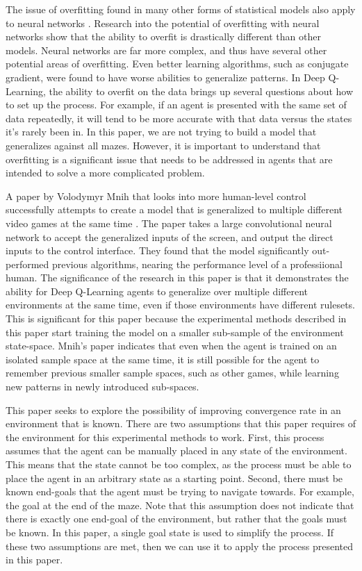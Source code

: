 \documentclass[12pt,letterpaper]{article}
\begin{document}
The issue of overfitting found in many other forms of statistical models also apply to neural networks \cite{article_overfitting_neural_networks}.
Research into the potential of overfitting with neural networks show that the ability to overfit is drastically different than other models.
Neural networks are far more complex, and thus have several other potential areas of overfitting.
Even better learning algorithms, such as conjugate gradient, were found to have worse abilities to generalize patterns.
In Deep Q-Learning, the ability to overfit on the data brings up several questions about how to set up the process.
For example, if an agent is presented with the same set of data repeatedly, it will tend to be more accurate with that data versus the states it's rarely been in.
In this paper, we are not trying to build a model that generalizes against all mazes.
However, it is important to understand that overfitting is a significant issue that needs to be addressed in agents that are intended to solve a more complicated problem.

A paper by Volodymyr Mnih that looks into more human-level control successfully attempts to create a model that is generalized to multiple different video games at the same time \cite{article_human_level_control_deep_reinforcement_learning}.
The paper takes a large convolutional neural network to accept the generalized inputs of the screen, and output the direct inputs to the control interface.
They found that the model significantly out-performed previous algorithms, nearing the performance level of a professiional human.
The significance of the research in this paper is that it demonstrates the ability for Deep Q-Learning agents to generalize over multiple different environments at the same time, even if those environments have different rulesets.
This is significant for this paper because the experimental methods described in this paper start training the model on a smaller sub-sample of the environment state-space.
Mnih's paper indicates that even when the agent is trained on an isolated sample space at the same time, it is still possible for the agent to remember previous smaller sample spaces, such as other games, while learning new patterns in newly introduced sub-spaces.

This paper seeks to explore the possibility of improving convergence rate in an environment that is known.
There are two assumptions that this paper requires of the environment for this experimental methods to work.
First, this process assumes that the agent can be manually placed in any state of the environment.
This means that the state cannot be too complex, as the process must be able to place the agent in an arbitrary state as a starting point.
Second, there must be known end-goals that the agent must be trying to navigate towards.
For example, the goal at the end of the maze.
Note that this assumption does not indicate that there is exactly one end-goal of the environment, but rather that the goals must be known.
In this paper, a single goal state is used to simplify the process.
If these two assumptions are met, then we can use it to apply the process presented in this paper.
\end{document}
